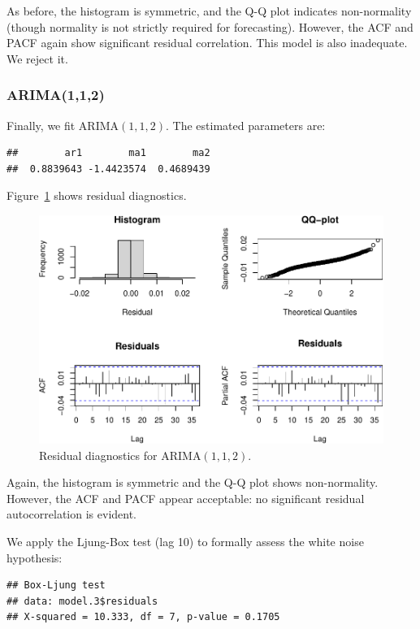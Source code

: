 \documentclass[final,11pt]{article}
\theoremstyle{plain}
\theoremstyle{remark}
\begin{document}
As before, the histogram is symmetric, and the Q-Q plot indicates
non-normality (though normality is not strictly required for forecasting).
However, the ACF and PACF again show significant residual correlation.
This model is also inadequate. We reject it.

\hypertarget{arima112}{%
\subsubsection{ARIMA(1,1,2)}\label{arima112}}

Finally, we fit ARIMA$(1,1,2)$. The estimated parameters are:

\begin{verbatim}
##        ar1        ma1        ma2
##  0.8839643 -1.4423574  0.4689439
\end{verbatim}

Figure~\ref{fig:res1} shows residual diagnostics.

\begin{figure}
\includegraphics{paper_files/figure-latex/unnamed-chunk-13-1.pdf}
\caption{Residual diagnostics for ARIMA$(1,1,2)$.}
\label{fig:res1}
\end{figure}

Again, the histogram is symmetric and the Q-Q plot shows non-normality.
However, the ACF and PACF appear acceptable: no significant residual
autocorrelation is evident.

We apply the Ljung-Box test (lag 10) to formally assess the white noise
hypothesis:

\begin{verbatim}
## Box-Ljung test
## data: model.3$residuals
## X-squared = 10.333, df = 7, p-value = 0.1705
\end{verbatim}
\end{document}
